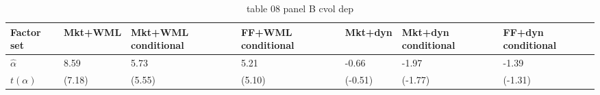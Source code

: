 \begin{table}[htbp]
  \centering
  \caption{table 08 panel B cvol dep}
  \label{tab:table_08_panel_B_cvol_dep}
  \begin{tabular}{lllllll}
\toprule
Factor set & Mkt+WML & Mkt+WML conditional & FF+WML conditional & Mkt+dyn & Mkt+dyn conditional & FF+dyn conditional \\
\midrule
$\hat{\alpha}$ & 8.59 & 5.73 & 5.21 & -0.66 & -1.97 & -1.39 \\
$t(\alpha)$ & (7.18) & (5.55) & (5.10) & (-0.51) & (-1.77) & (-1.31) \\
\bottomrule
\end{tabular}

\end{table}
